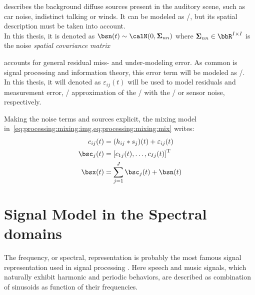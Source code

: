  describes the background diffuse sources present in the auditory scene, such as car noise, indistinct talking or winds.
It can be modeled as \AWGNdef/, but its spatial description must be taken into account.
\\In this thesis, it is denoted as $\bsn(t) \sim \calN(0, \cov_{nn})$ where $\cov_{nn} \in \bbR^{I \times I}$ is the noise \textit{spatial covariance matrix}

 accounts for general residual miss- and under-modeling error.
As common is signal processing and information theory, this error term will be modeled as \AWGN/.
\\In this thesis, it will denoted as $\varepsilon_{ij}( t)$ will be used to model residuals and measurement error,
\eg/ approximation of the \RIR/ with the \ISM/ or sensor noise, respectively.

\medskip\noindent
Making the noise terms and sources explicit, the mixing model in~\cref{eq:processing:mixing:img,eq:processing:mixing:mix} writes:
\begin{align}
    \img_{\idxMic\idxSrc}(t) &=  \kparen{h_{\idxMic\idxSrc} \conv \src_\idxSrc} (t) +  \varepsilon_{ij}(t)\\
    \imgs_\idxSrc(t)         &= \ktranspose{\klist{\img_{1\idxSrc}(t), \dots, \img_{\numMics\idxSrc}(t)}} \nonumber\\
    \mics(t)                 &= \sum_{\idxSrc=1}^{\numSrcs} \imgs_\idxSrc(t) + \bsn( t)
\end{align}%


\section{Signal Model in the Spectral domains}\label{sec:processing:domains}
The frequency, or spectral, representation is probably the most famous signal representation used in signal processing
.
Here speech and music signals, which naturally exhibit harmonic and periodic behaviors,
are described as combination of sinusoids as function of their frequencies.

